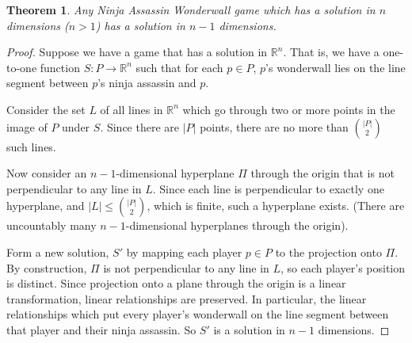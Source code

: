 \documentclass[12pt]{article}
\newtheorem*{thm}{Theorem}
\begin{document}
    \begin{thm}
    Any Ninja Assassin Wonderwall game which has a solution in $n$ dimensions ($n > 1$) has a solution in $n-1$ dimensions.
    \end{thm}
    \begin{proof}
    Suppose we have a game that has a solution in $\mathbb{R}^n$. That is, we have a one-to-one function $S: P \to \mathbb{R}^n$ such that for each $p \in P$, $p$'s wonderwall lies on the line segment between $p$'s ninja assassin and $p$. 

    Consider the set $L$ of all lines in $\mathbb{R}^n$ which go through two or more points in the image of $P$ under $S$. Since there are $\lvert P \rvert$ points, there are no more than $\binom{ \lvert P \rvert}{2}$ such lines. 

    Now consider an $n-1$-dimensional hyperplane $\Pi$ through the origin that is not perpendicular to any line in $L$. Since each line is perpendicular to exactly one hyperplane, and $\lvert L \rvert \leq \binom{\lvert P \rvert}{2}$, which is finite, such a hyperplane exists. (There are uncountably many $n-1$-dimensional hyperplanes through the origin).

    Form a new solution, $S'$ by mapping each player $p\in P$ to the projection onto $\Pi$. By construction, $\Pi$ is not perpendicular to any line in $L$, so each player's position is distinct. Since projection onto a plane through the origin is a linear transformation, linear relationships are preserved. In particular, the linear relationships which put every player's wonderwall on the line segment between that player and their ninja assassin. So $S'$ is a solution in $n-1$ dimensions.
    \end{proof}
\end{document}
